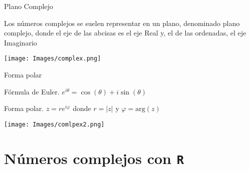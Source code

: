 \documentclass[
  ignorenonframetext,
]{beamer}
\begin{document}
\begin{frame}{Plano Complejo}
\protect\hypertarget{plano-complejo}{}

Los números complejos se suelen representar en un plano, denominado
plano complejo, donde el eje de las abcisas es el eje Real y, el de las
ordenadas, el eje Imaginario

\texttt{[image: Images/complex.png]}

\end{frame}

\begin{frame}{Forma polar}
\protect\hypertarget{forma-polar}{}

Fórmula de Euler. \(e^{i\theta}=\cos(\theta)+i\sin(\theta)\)

Forma polar. \(z=re^{i\varphi}\) donde \(r = |z|\) y
\(\varphi = \text{arg}(z)\)

\texttt{[image: Images/comlpex2.png]}

\end{frame}

\hypertarget{nuxfameros-complejos-con-r}{%
\section{\texorpdfstring{Números complejos con
\texttt{R}}{Números complejos con R}}\label{nuxfameros-complejos-con-r}}
\end{document}
